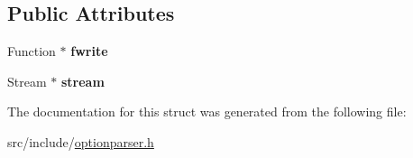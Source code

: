 \subsection*{Public Attributes}
\begin{DoxyCompactItemize}
\item 
\hypertarget{structxmem_1_1config_1_1third__party_1_1_print_usage_implementation_1_1_stream_writer_acf48d2de031f76c609ab518fc757cfc1}{Function $\ast$ {\bfseries fwrite}}\label{structxmem_1_1config_1_1third__party_1_1_print_usage_implementation_1_1_stream_writer_acf48d2de031f76c609ab518fc757cfc1}

\item 
\hypertarget{structxmem_1_1config_1_1third__party_1_1_print_usage_implementation_1_1_stream_writer_ad0c294cda61db3cc2f7776def7466217}{Stream $\ast$ {\bfseries stream}}\label{structxmem_1_1config_1_1third__party_1_1_print_usage_implementation_1_1_stream_writer_ad0c294cda61db3cc2f7776def7466217}

\end{DoxyCompactItemize}


The documentation for this struct was generated from the following file\-:\begin{DoxyCompactItemize}
\item 
src/include/\hyperlink{optionparser_8h}{optionparser.\-h}\end{DoxyCompactItemize}

